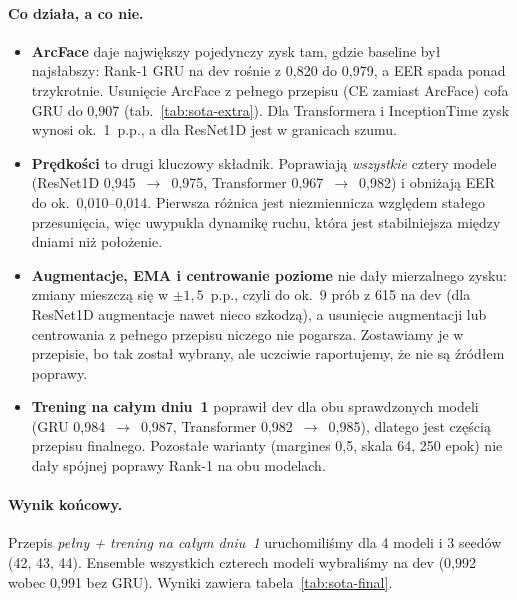 \paragraph{Co działa, a co nie.}
\begin{itemize}
  \item \textbf{ArcFace} daje największy pojedynczy zysk tam, gdzie baseline był najsłabszy:
        Rank-1 GRU na dev rośnie z 0{,}820 do 0{,}979, a EER spada ponad trzykrotnie. Usunięcie ArcFace z
        pełnego przepisu (CE zamiast ArcFace) cofa GRU do 0{,}907 (tab.~\ref{tab:sota-extra}).
        Dla Transformera i InceptionTime zysk wynosi ok.~1~p.p., a dla ResNet1D jest w granicach
        szumu.
  \item \textbf{Prędkości} to drugi kluczowy składnik. Poprawiają \emph{wszystkie} cztery modele
        (ResNet1D 0{,}945~$\to$~0{,}975, Transformer 0{,}967~$\to$~0{,}982) i obniżają EER do
        ok.~0{,}010--0{,}014. Pierwsza różnica jest niezmiennicza względem stałego przesunięcia, więc
        uwypukla dynamikę ruchu, która jest stabilniejsza między dniami niż położenie.
  \item \textbf{Augmentacje, EMA i centrowanie poziome} nie dały mierzalnego zysku: zmiany mieszczą
        się w $\pm 1{,}5$~p.p., czyli do ok.~9 prób z 615 na dev (dla ResNet1D augmentacje nawet
        nieco szkodzą), a usunięcie augmentacji lub centrowania z pełnego przepisu niczego nie
        pogarsza. Zostawiamy je w przepisie, bo tak został wybrany, ale
        uczciwie raportujemy, że nie są źródłem poprawy.
  \item \textbf{Trening na całym dniu~1} poprawił dev dla obu sprawdzonych modeli (GRU
        0{,}984~$\to$~0{,}987, Transformer 0{,}982~$\to$~0{,}985), dlatego jest częścią przepisu
        finalnego. Pozostałe warianty (margines 0{,}5, skala 64, 250 epok) nie dały spójnej poprawy
        Rank-1 na obu modelach.
\end{itemize}

\paragraph{Wynik końcowy.} Przepis \emph{pełny + trening na całym dniu~1} uruchomiliśmy dla 4 modeli i
3 seedów (42, 43, 44). Ensemble wszystkich czterech modeli wybraliśmy na dev (0{,}992 wobec 0{,}991
bez GRU). Wyniki zawiera tabela~\ref{tab:sota-final}.

